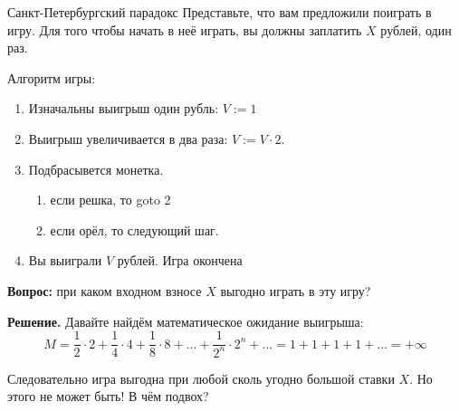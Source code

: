 \begin{frame}{Санкт-Петербургский парадокс}
	\footnotesize
	Представьте, что вам предложили поиграть в игру.
	Для того чтобы начать в неё играть, вы должны заплатить $X$ рублей, один раз.
	
	Алгоритм игры:
	\begin{enumerate}
		\item Изначальны выигрыш один рубль: $V:=1$
		\item Выигрыш увеличивается в два раза: $V:=V \cdot 2$.
		\item Подбрасывется монетка.
		\begin{enumerate}
			 \item если решка, то goto 2
			 \item если орёл, то следующий шаг.
		\end{enumerate}  
		\item Вы выиграли $V$ рублей. Игра окончена
	\end{enumerate} 
	
	\textbf{Вопрос:} при каком входном взносе $X$ выгодно играть в эту игру?
	
	\textbf{Решение.} Давайте найдём математическое ожидание выигрыша:
	\begin{equation}
	M = \frac{1}{2} \cdot 2 + \frac{1}{4} \cdot 4 + \frac{1}{8} \cdot 8 + ... + \frac{1}{2^n} \cdot 2^n + ... = 1 + 1 + 1 + 1 + ... = + \infty
	\end{equation}
	
	Следовательно игра выгодна при любой сколь угодно большой ставки $X$.
	Но этого не может быть! В чём подвох?
	
	
\end{frame}


%	
%	
%	
%	


  
